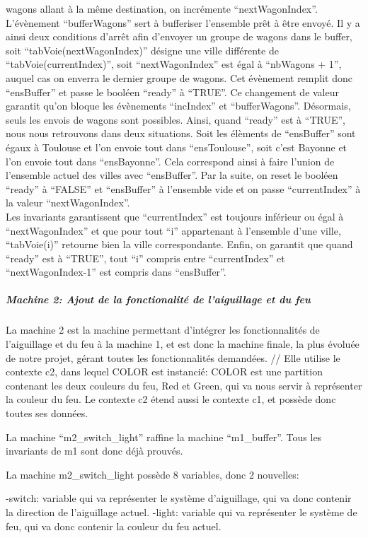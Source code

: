 wagons allant à la même destination, on incrémente ``nextWagonIndex''.
L'évènement ``bufferWagons'' sert à bufferiser l'ensemble prêt à être envoyé. Il y a
ainsi deux conditions d'arrêt afin d'envoyer un groupe de wagons dans le buffer,
soit ``tabVoie(nextWagonIndex)'' désigne une ville différente de
``tabVoie(currentIndex)'', soit ``nextWagonIndex'' est égal à ``nbWagons + 1'', auquel
cas on enverra le dernier groupe de wagons. Cet évènement remplit donc ``ensBuffer''
et passe le booléen ``ready'' à ``TRUE''. Ce changement de valeur garantit qu'on
bloque les évènements ``incIndex'' et ``bufferWagons''. Désormais, seuls les envois
de wagons sont possibles.
Ainsi, quand ``ready'' est à ``TRUE'', nous nous retrouvons dans deux situations.
Soit les élèments de ``ensBuffer'' sont égaux à Toulouse et l'on envoie tout dans
``ensToulouse'', soit c'est Bayonne et l'on envoie tout dans ``ensBayonne''. Cela
correspond ainsi à faire l'union de l'ensemble actuel des villes avec ``ensBuffer''.
Par la suite, on reset le booléen ``ready'' à ``FALSE'' et ``ensBuffer'' à l'ensemble
vide et on passe ``currentIndex'' à la valeur ``nextWagonIndex''.
\\
Les invariants garantissent que ``currentIndex'' est toujours inférieur ou égal à
``nextWagonIndex'' et que pour tout ``i'' appartenant à l'ensemble d'une ville,
``tabVoie(i)'' retourne bien la ville correspondante. Enfin, on garantit que quand
``ready'' est à ``TRUE'', tout ``i'' compris entre ``currentIndex'' et ``nextWagonIndex-1'' est compris dans ``ensBuffer''.


\subparagraph{Machine 2: Ajout de la fonctionalité de l'aiguillage et du feu}



La machine 2 est la machine permettant d'intégrer les fonctionnalités de l'aiguillage et du feu à la machine 1, et est donc la machine finale, la plus évoluée de notre projet, gérant toutes les fonctionnalités demandées.
//
Elle utilise le contexte c2,  dans lequel COLOR est instancié: COLOR est une  partition contenant les deux couleurs du feu, Red et Green,
qui va nous servir à représenter la couleur du feu.
Le contexte c2 étend aussi le contexte c1, et possède donc toutes ses données.

La machine ``m2\_switch\_light'' raffine la machine ``m1\_buffer''. Tous les invariants de m1 sont donc déjà prouvés.

La machine m2\_switch\_light possède 8 variables, donc 2 nouvelles:

-switch: variable qui va représenter le système d'aiguillage, qui va donc contenir la direction de l'aiguillage actuel.
-light: variable qui va représenter le système de feu, qui va donc contenir la couleur du feu actuel.


